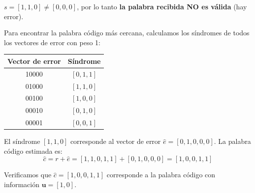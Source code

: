\documentclass[10pt,a4paper]{article}
\begin{document}
\begin{solucion}
$s = [1,1,0] \neq [0,0,0]$, por lo tanto \textbf{la palabra recibida NO es válida} (hay error).

Para encontrar la palabra código más cercana, calculamos los síndromes de todos los vectores de error con peso 1:

\begin{center}
\begin{tabular}{|c|c|}
\hline
Vector de error & Síndrome \\
\hline
10000 & $[0,1,1]$ \\
01000 & $[1,1,0]$ \\
00100 & $[1,0,0]$ \\
00010 & $[0,1,0]$ \\
00001 & $[0,0,1]$ \\
\hline
\end{tabular}
\end{center}

El síndrome $[1,1,0]$ corresponde al vector de error $\hat{e} = [0,1,0,0,0]$. La palabra código estimada es:
\[
\hat{c} = r + \hat{e} = [1,1,0,1,1] + [0,1,0,0,0] = [1,0,0,1,1]
\]

Verificamos que $\hat{c} = [1,0,0,1,1]$ corresponde a la palabra código con información $\mathbf{u} = [1,0]$.
\end{solucion}
\end{document}
